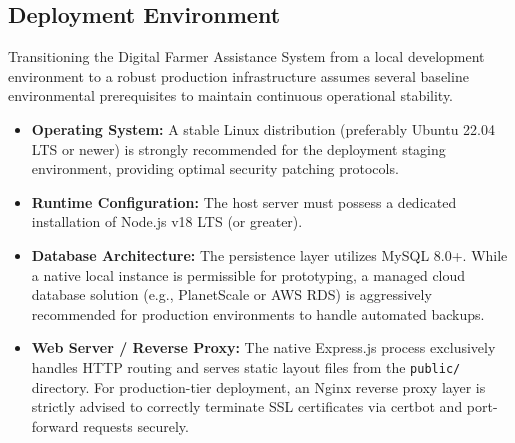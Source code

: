 \subsection{Deployment Environment}
Transitioning the Digital Farmer Assistance System from a local development environment to a robust production infrastructure assumes several baseline environmental prerequisites to maintain continuous operational stability.

\begin{itemize}
    \item \textbf{Operating System:} A stable Linux distribution (preferably Ubuntu 22.04 LTS or newer) is strongly recommended for the deployment staging environment, providing optimal security patching protocols.
    \item \textbf{Runtime Configuration:} The host server must possess a dedicated installation of Node.js v18 LTS (or greater).
    \item \textbf{Database Architecture:} The persistence layer utilizes MySQL 8.0+. While a native local instance is permissible for prototyping, a managed cloud database solution (e.g., PlanetScale or AWS RDS) is aggressively recommended for production environments to handle automated backups.
    \item \textbf{Web Server / Reverse Proxy:} The native Express.js process exclusively handles HTTP routing and serves static layout files from the \texttt{public/} directory. For production-tier deployment, an Nginx reverse proxy layer is strictly advised to correctly terminate SSL certificates via certbot and port-forward requests securely.
\end{itemize}

